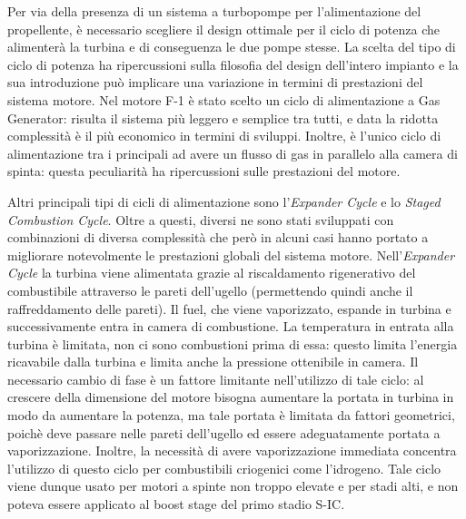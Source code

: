Per via della presenza di un sistema a turbopompe per l'alimentazione del propellente, è necessario scegliere il design ottimale per il ciclo di potenza che alimenterà la turbina e di conseguenza le due pompe stesse.
La scelta del tipo di ciclo di potenza ha ripercussioni sulla filosofia del design dell'intero impianto e la sua introduzione può implicare una variazione in termini di prestazioni del sistema motore.
Nel motore F-1 è stato scelto un ciclo di alimentazione a Gas Generator: risulta il sistema più leggero e semplice tra tutti, e data la ridotta complessità è il più economico in termini di sviluppi.
Inoltre, è l'unico ciclo di alimentazione tra i principali ad avere un flusso di gas in parallelo alla camera di spinta: questa peculiarità ha ripercussioni sulle prestazioni del motore.

Altri principali tipi di cicli di alimentazione sono l'\textit{Expander Cycle} e lo \textit{Staged Combustion Cycle}. Oltre a questi, diversi ne sono stati sviluppati con combinazioni di diversa complessità che però in alcuni casi hanno portato a migliorare notevolmente le prestazioni globali del sistema motore.
Nell'\textit{Expander Cycle} la turbina viene alimentata grazie al riscaldamento rigenerativo del combustibile attraverso le pareti dell'ugello (permettendo quindi anche il raffreddamento delle pareti).
Il fuel, che viene vaporizzato, espande in turbina e successivamente entra in camera di combustione. La temperatura in entrata alla turbina è limitata, non ci sono combustioni prima di essa: questo limita l'energia ricavabile dalla turbina e limita anche la pressione ottenibile in camera.
Il necessario cambio di fase è un fattore limitante nell'utilizzo di tale ciclo: al crescere della dimensione del motore bisogna aumentare la portata in turbina in modo da aumentare la potenza, ma tale portata è limitata da fattori geometrici, poichè deve passare nelle pareti dell'ugello ed essere adeguatamente portata a vaporizzazione.
Inoltre, la necessità di avere vaporizzazione immediata concentra l'utilizzo di questo ciclo per combustibili criogenici come l'idrogeno. Tale ciclo viene dunque usato per motori a spinte non troppo elevate e per stadi alti, e non poteva essere applicato al boost stage del primo stadio S-IC.

